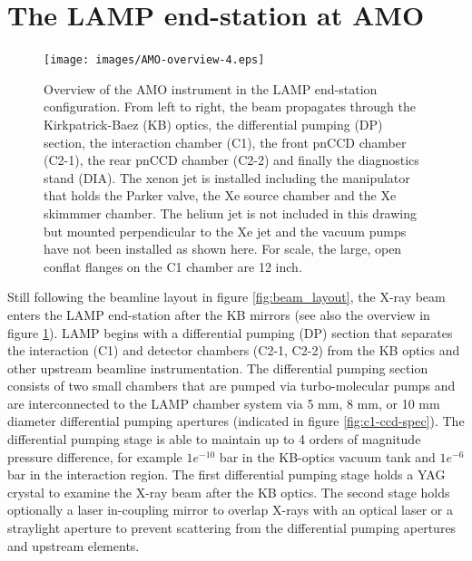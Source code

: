 \section{The LAMP end-station at AMO}\label{sec:LAMP-endstation}
\begin{figure}
	\centering
		\texttt{[image: images/AMO-overview-4.eps]}
	\caption[Overview of the AMO instrument in the LAMP end-station configuration.]{Overview of the AMO instrument in the LAMP end-station configuration. From left to right, the beam propagates through the Kirkpatrick-Baez (KB) optics, the differential pumping (DP) section, the interaction chamber (C1), the front pnCCD chamber (C2-1), the rear pnCCD chamber (C2-2) and finally the diagnostics stand (DIA). The xenon jet is installed including the manipulator that holds the Parker valve, the Xe source chamber and the Xe skimmmer chamber. The helium jet is not included in this drawing but mounted perpendicular to the Xe jet and the vacuum pumps have not been installed as shown here. For scale, the large, open conflat flanges on the C1 chamber are 12 inch.}
	\label{fig:LAMP-overview}
\end{figure}
Still following the beamline layout in figure \ref{fig:beam_layout}, the X-ray beam enters the LAMP end-station after the KB mirrors (see also the overview in figure \ref{fig:LAMP-overview}). LAMP begins with a differential pumping (DP) section that separates the interaction (C1) and detector chambers (C2-1, C2-2) from the KB optics and other upstream beamline instrumentation. The differential pumping section consists of two small chambers that are pumped via turbo-molecular pumps and are interconnected to the LAMP chamber system via 5 mm, 8 mm, or 10 mm diameter differential pumping apertures (indicated in figure \ref{fig:c1-ccd-spec}). The differential pumping stage is able to maintain up to 4 orders of magnitude pressure difference, for example $1e^{-10}$ bar in the KB-optics vacuum tank and $1e^{-6}$ bar in the interaction region. The first differential pumping stage holds a YAG crystal to examine the X-ray beam after the KB optics. The second stage holds optionally a laser in-coupling mirror to overlap X-rays with an optical laser or a straylight aperture to prevent scattering from the differential pumping apertures and upstream elements.\\

